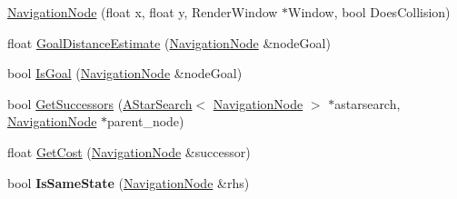 \begin{DoxyCompactItemize}
\item 
\hyperlink{struct_engine_1_1_core_1_1_navigation_node_a67ff011cd89aced43978f3f6265f6c63}{Navigation\+Node} (float x, float y, Render\+Window $\ast$Window, bool Does\+Collision)
\item 
float \hyperlink{struct_engine_1_1_core_1_1_navigation_node_acd420576ac7c916755d9c7a9908a6aad}{Goal\+Distance\+Estimate} (\hyperlink{struct_engine_1_1_core_1_1_navigation_node}{Navigation\+Node} \&node\+Goal)
\item 
bool \hyperlink{struct_engine_1_1_core_1_1_navigation_node_aa838e27a48677c1359fc1bab0b8a8591}{Is\+Goal} (\hyperlink{struct_engine_1_1_core_1_1_navigation_node}{Navigation\+Node} \&node\+Goal)
\item 
bool \hyperlink{struct_engine_1_1_core_1_1_navigation_node_a4e049fbcda1bb269303da91692d05033}{Get\+Successors} (\hyperlink{class_a_star_search}{A\+Star\+Search}$<$ \hyperlink{struct_engine_1_1_core_1_1_navigation_node}{Navigation\+Node} $>$ $\ast$astarsearch, \hyperlink{struct_engine_1_1_core_1_1_navigation_node}{Navigation\+Node} $\ast$parent\+\_\+node)
\item 
float \hyperlink{struct_engine_1_1_core_1_1_navigation_node_a2d2f49adb68c3b880b750875ad15a50b}{Get\+Cost} (\hyperlink{struct_engine_1_1_core_1_1_navigation_node}{Navigation\+Node} \&successor)
\item 
\mbox{\label{struct_engine_1_1_core_1_1_navigation_node_ab265c716b1b82675c800f7027e0666d8}} 
bool {\bfseries Is\+Same\+State} (\hyperlink{struct_engine_1_1_core_1_1_navigation_node}{Navigation\+Node} \&rhs)
\end{DoxyCompactItemize}
